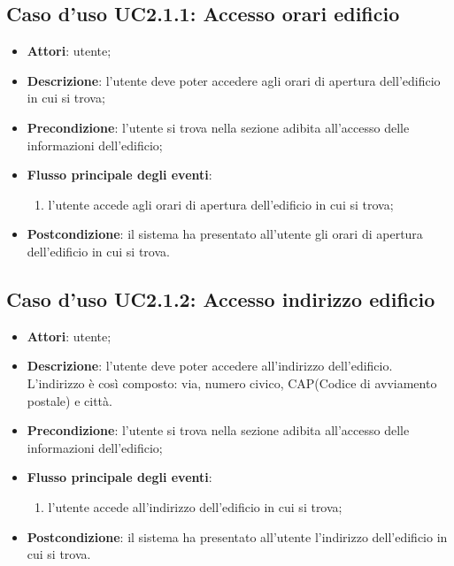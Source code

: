 \documentclass[../AnalisiDeiRequisiti.tex]{subfiles}
\begin{document}
\subsection{Caso d'uso UC2.1.1: Accesso orari edificio}

\begin{itemize}
\item \textbf{Attori}: utente;
\item \textbf{Descrizione}: l'utente deve poter accedere agli orari di apertura dell'edificio in cui si trova; 
      \item \textbf{Precondizione}: l'utente si trova nella sezione adibita all'accesso delle informazioni dell'edificio;

        \item \textbf{Flusso principale degli eventi}:
          \begin{enumerate}
          \item l'utente accede agli orari di apertura dell'edificio in cui si trova;

      \end{enumerate}
    \item \textbf{Postcondizione}: il sistema ha presentato all'utente gli orari di apertura dell'edificio in cui si trova.
  \end{itemize}
\hypertarget{UC2.1.2}{}
\subsection{Caso d'uso UC2.1.2: Accesso indirizzo edificio}

\begin{itemize}
\item \textbf{Attori}: utente;
\item \textbf{Descrizione}: l’utente deve poter accedere all’indirizzo dell’edificio. L’indirizzo è così composto: via, numero civico, CAP(Codice di avviamento postale) e città.
      \item \textbf{Precondizione}: l'utente si trova nella sezione adibita all'accesso delle informazioni dell'edificio;

        \item \textbf{Flusso principale degli eventi}:
          \begin{enumerate}
          \item l'utente accede all'indirizzo dell'edificio in cui si trova;

      \end{enumerate}
    \item \textbf{Postcondizione}: il sistema ha presentato all'utente l'indirizzo dell'edificio in cui si trova.
  \end{itemize}
\hypertarget{UC2.1.3}{}
\end{document}
